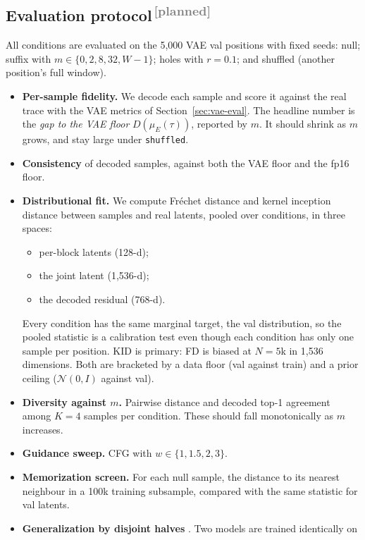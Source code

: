 \documentclass[11pt]{article}
\newcommand{\N}{\mathcal{N}}
\newcommand{\planned}{\textsuperscript{\textcolor{gray}{\,[planned]}}}
\begin{document}
\subsection{Evaluation protocol\planned}

All conditions are evaluated on the 5{,}000 VAE val positions with fixed seeds: null; suffix with
$m\in\{0, 2, 8, 32, W-1\}$; holes with $r = 0.1$; and shuffled (another position's full window).
\begin{itemize}[leftmargin=1.5em]
  \item \textbf{Per-sample fidelity.} We decode each sample and score it against the real trace with the VAE metrics of
    Section~\ref{sec:vae-eval}. The headline number is the \emph{gap to the VAE floor} $D(\mu_E(\tau))$, reported by $m$. It
    should shrink as $m$ grows, and stay large under \texttt{shuffled}.
  \item \textbf{Consistency} of decoded samples, against both the VAE floor and the fp16 floor.
  \item \textbf{Distributional fit.} We compute Fréchet distance \citep{heusel2017fid} and kernel inception distance
    \citep{binkowski2018kid} between samples and real latents, pooled over conditions, in three spaces:
    \begin{itemize}[leftmargin=1.2em]
      \item per-block latents (128-d);
      \item the joint latent (1{,}536-d);
      \item the decoded residual (768-d).
    \end{itemize}
    Every condition has the same marginal target, the val distribution, so the pooled statistic is a calibration test even
    though each condition has only one sample per position. KID is primary: FD is biased at $N = 5$k in 1{,}536 dimensions.
    Both are bracketed by a data floor (val against train) and a prior ceiling ($\N(0,I)$ against val).
  \item \textbf{Diversity against $m$.} Pairwise distance and decoded top-1 agreement among $K = 4$ samples per condition.
    These should fall monotonically as $m$ increases.
  \item \textbf{Guidance sweep.} CFG with $w \in\{1, 1.5, 2, 3\}$.
  \item \textbf{Memorization screen.} For each null sample, the distance to its nearest neighbour in a 100k training
    subsample, compared with the same statistic for val latents.
  \item \textbf{Generalization by disjoint halves} \citep{kadkhodaie2024generalization}. Two models are trained identically on

\end{itemize}
\end{document}
